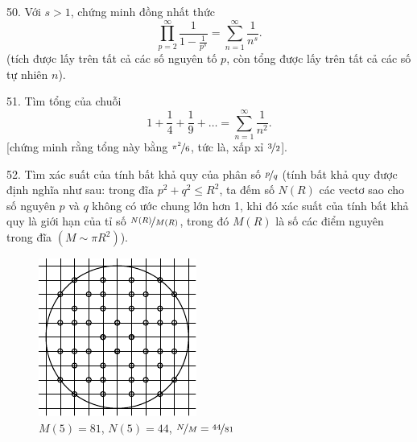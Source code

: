 \begin{problem}{50.}
	Với $s>1$, chứng minh đồng nhất thức
	\begin{equation*}
		\textstyle\prod\limits_{p=2}^{\infty} \frac{1}{1-\frac{1}{p^s}}=\textstyle\sum\limits_{n=1}^{\infty} \frac{1}{n^s}.
	\end{equation*}
	(tích được lấy trên tất cả các số nguyên tố $p$, còn tổng được lấy trên tất cả các số tự nhiên $n$).
\end{problem}

\begin{problem}{51.}
	Tìm tổng của chuỗi
	\begin{equation*}
		1+ \frac{1}{4}+ \frac{1}{9}+\dots=\textstyle\sum\limits_{n=1}^{\infty} \frac{1}{n^2}.
	\end{equation*}
	[chứng minh rằng tổng này bằng $\nicefrac{\pi^2}{6}$, tức là, xấp xỉ $\nicefrac{3}{2}$].
\end{problem}

\begin{problem}{52.}
	Tìm xác suất của tính bất khả quy của phân số $\nicefrac{p}{q}$ (tính bất khả quy được định nghĩa như sau: trong đĩa $p^2+q^2 \leqslant R^2$, ta đếm số $N(R)$ các vectơ sao cho số nguyên $p$ và $q$ không có ước chung lớn hơn 1, khi đó xác suất của tính bất khả quy là giới hạn của tỉ số $\nicefrac{N(R)}{M(R)}$, trong đó $M(R)$ là số các điểm nguyên trong đĩa $(M\sim \pi R^2)$).
	\begin{figure}
		\includegraphics{taskbook-36}\\
		\footnotesize $M(5)=81$, $N(5)=44$, $\nicefrac{N}{M} = \nicefrac{44}{81}$
	\end{figure}
\end{problem}

